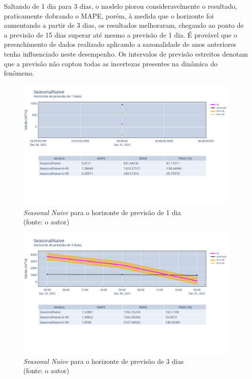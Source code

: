 Saltando de 1 dia para 3 dias, o modelo piorou consideravelmente o resultado, praticamente dobrando o MAPE, porém, à medida que o horizonte foi aumentando a partir de 3 dias, os resultados melhoraram, chegando ao ponto de a previsão de 15 dias superar até mesmo a previsão de 1 dia. É provável que o preenchimento de dados realizado aplicando a sazonalidade de anos anteriores tenha influenciado neste desempenho. Os intervalos de previsão estreitos denotam que a previsão não captou todas as incertezas presentes na dinâmica do fenômeno.\cite{RobHyndman_prediction_intervals}

\begin{figure}[!h]
	\centering
	\includegraphics[scale=0.33]{Figuras/jequiti/resultados/SeasonalNaive_fh1.png}
	\caption{\textit{Seasonal Naive} para o horizonte de previsão de 1 dia\\(fonte: o autor)}
	\label{fig:jequiti_SeasonalNaive_fh1}
\end{figure}

\begin{figure}[!h]
	\centering
	\includegraphics[scale=0.33]{Figuras/jequiti/resultados/SeasonalNaive_fh3.png}
	\caption{\textit{Seasonal Naive} para o horizonte de previsão de 3 dias\\(fonte: o autor)}
	\label{fig:jequiti_SeasonalNaive_fh3}
\end{figure}

